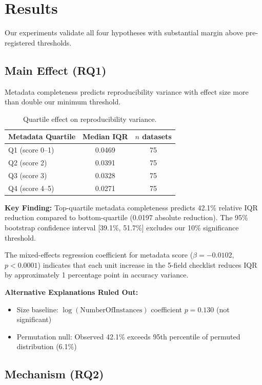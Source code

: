 \section{Results}
\label{sec:results}

Our experiments validate all four hypotheses with substantial margin above pre-registered thresholds.

\subsection{Main Effect (RQ1)}

Metadata completeness predicts reproducibility variance with effect size more than double our minimum threshold.

\begin{table}[h]
\centering
\begin{tabular}{@{}lcc@{}}
\toprule
Metadata Quartile & Median IQR & $n$ datasets \\
\midrule
Q1 (score 0--1) & 0.0469 & 75 \\
Q2 (score 2) & 0.0391 & 75 \\
Q3 (score 3) & 0.0328 & 75 \\
Q4 (score 4--5) & 0.0271 & 75 \\
\bottomrule
\end{tabular}
\caption{Quartile effect on reproducibility variance.}
\label{tab:quartiles}
\end{table}

\textbf{Key Finding:} Top-quartile metadata completeness predicts 42.1\% relative IQR reduction compared to bottom-quartile (0.0197 absolute reduction). The 95\% bootstrap confidence interval [39.1\%, 51.7\%] excludes our 10\% significance threshold.

The mixed-effects regression coefficient for metadata score ($\beta = -0.0102$, $p < 0.0001$) indicates that each unit increase in the 5-field checklist reduces IQR by approximately 1 percentage point in accuracy variance.

\textbf{Alternative Explanations Ruled Out:}
\begin{itemize}
    \item Size baseline: $\log(\text{NumberOfInstances})$ coefficient $p = 0.130$ (not significant)
    \item Permutation null: Observed 42.1\% exceeds 95th percentile of permuted distribution (6.1\%)
\end{itemize}

\subsection{Mechanism (RQ2)}

